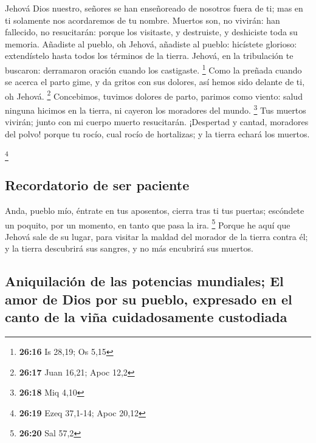  Jehová Dios nuestro, señores se han enseñoreado de
nosotros fuera de ti; mas en ti solamente nos acordaremos de tu nombre.
 Muertos son, no vivirán: han fallecido, no resucitarán:
porque los visitaste, y destruiste, y deshiciste toda su memoria.
 Añadiste al pueblo, oh Jehová, añadiste al pueblo:
hicístete glorioso: extendístelo hasta todos los términos de la tierra.
 Jehová, en la tribulación te buscaron: derramaron
oración cuando los castigaste. \footnote{\textbf{26:16} Is 28,19; Os
  5,15}  Como la preñada cuando se acerca el parto gime,
y da gritos con sus dolores, así hemos sido delante de ti, oh Jehová.
\footnote{\textbf{26:17} Juan 16,21; Apoc 12,2} 
Concebimos, tuvimos dolores de parto, parimos como viento: salud ninguna
hicimos en la tierra, ni cayeron los moradores del mundo. \footnote{\textbf{26:18}
  Miq 4,10}  Tus muertos vivirán; junto con mi cuerpo
muerto resucitarán. ¡Despertad y cantad, moradores del polvo! porque tu
rocío, cual rocío de hortalizas; y la tierra echará los muertos.

\footnote{\textbf{26:19} Ezeq 37,1-14; Apoc 20,12}

\hypertarget{recordatorio-de-ser-paciente}{%
\subsection{Recordatorio de ser
paciente}\label{recordatorio-de-ser-paciente}}

 Anda, pueblo mío, éntrate en tus aposentos, cierra tras
ti tus puertas; escóndete un poquito, por un momento, en tanto que pasa
la ira. \footnote{\textbf{26:20} Sal 57,2}  Porque he
aquí que Jehová sale de su lugar, para visitar la maldad del morador de
la tierra contra él; y la tierra descubrirá sus sangres, y no más
encubrirá sus muertos.

\hypertarget{aniquilaciuxf3n-de-las-potencias-mundiales-el-amor-de-dios-por-su-pueblo-expresado-en-el-canto-de-la-viuxf1a-cuidadosamente-custodiada}{%
\subsection{Aniquilación de las potencias mundiales; El amor de Dios por
su pueblo, expresado en el canto de la viña cuidadosamente
custodiada}\label{aniquilaciuxf3n-de-las-potencias-mundiales-el-amor-de-dios-por-su-pueblo-expresado-en-el-canto-de-la-viuxf1a-cuidadosamente-custodiada}}

